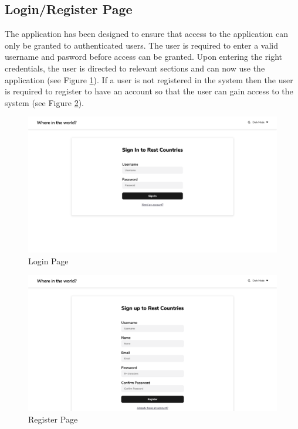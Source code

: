 \documentclass[twoside, a4paper, 12pt]{report}
\begin{document}
\subsection{Login/Register Page}
The application has been designed to ensure that access to the application can only be granted to authenticated users. The user is required to enter a valid username and pasword before access can be granted. Upon entering the right credentials, the user is directed to relevant sections and can now use the application (see Figure \ref{fig:login_page}). If a user is not registered in the system then the user is required to register to have an account so that the user can gain access to the system (see Figure \ref{fig:register_page}).

\begin{figure} 
	\centering
	\includegraphics[width=1.0\textwidth]{LoginPage.png}
	\caption{Login Page}
	\label{fig:login_page}
\end{figure}

\begin{figure}
	\centering
	\includegraphics[width=1.0\textwidth]{RegisterPage.png}
	\caption{Register Page}
	\label{fig:register_page}
\end{figure}
\end{document}
